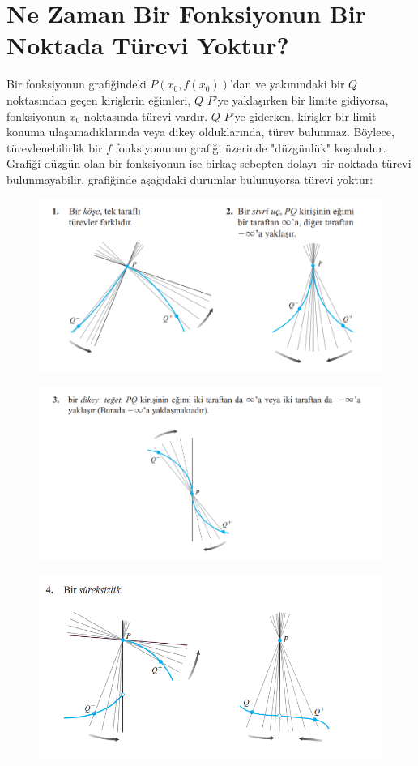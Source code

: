 \section{\protect Ne Zaman Bir Fonksiyonun Bir Noktada Türevi Yoktur?}\label{bolumetiketi}
Bir fonksiyonun grafiğindeki $P(x_0,f(x_0))$'dan ve yakınındaki bir $Q$ noktasından geçen kirişlerin eğimleri, $Q$ $P$'ye yaklaşırken bir limite gidiyorsa, fonksiyonun $x_0$ noktasında türevi vardır. $Q$  $P$'ye giderken, kirişler bir limit konuma ulaşamadıklarında veya dikey olduklarında, türev bulunmaz. Böylece, türevlenebilirlik bir $f$ fonksiyonunun grafiği üzerinde "düzgünlük" koşuludur. Grafiği düzgün olan bir fonksiyonun ise birkaç sebepten dolayı bir noktada türevi bulunmayabilir, grafiğinde aşağıdaki durumlar bulunuyorsa türevi yoktur:
\begin{figure}[H]
	\centering
	\includegraphics[width=0.75\linewidth]{turevyok1.png}
	\label{fig:ornekresim}
\end{figure}
\begin{figure}[H]
	\centering
	\includegraphics[width=0.75\linewidth]{turevyok2.png}
	\label{fig:ornekresim}
\end{figure}
\begin{figure}[H]
	\centering
	\includegraphics[width=0.75\linewidth]{turevyok3.png}
	\label{fig:ornekresim}
\end{figure}
